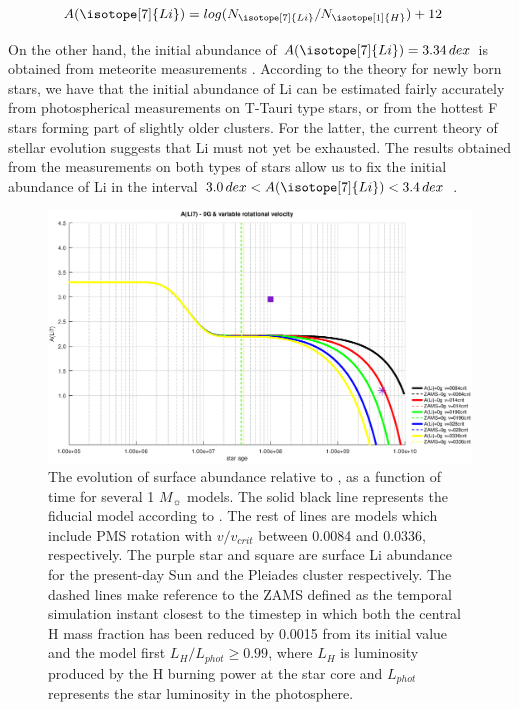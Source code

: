 \documentclass[fleqn,usenatbib]{mnras}
\begin{document}
\begin{ceqn}
\begin{align}
    A(\isotope[7]{Li}) &= log(N_{\isotope[7]{Li}} / N_{\isotope[1]{H}}) + 12
    \label{eq:A_Li}
\end{align}
\end{ceqn}

On the other hand, the initial abundance of $A(\isotope[7]{Li}) = 3.34 \, dex$ is obtained from meteorite measurements \citet{Randich2006}. According to the theory for newly born stars, we have that the initial abundance of Li can be estimated fairly accurately from photospherical measurements on T-Tauri type stars, or from the hottest F stars forming part of slightly older clusters. For the latter, the current theory of stellar evolution suggests that Li must not yet be exhausted. The results obtained from the measurements on both types of stars allow us to fix the initial abundance of Li in the interval $3.0 \, dex < A(\isotope[7]{Li}) < 3.4 \, dex$ \citet{Randich2006}.\par

\begin{figure}
	\includegraphics[width=\columnwidth]{figures/li_var_vel_0_0g.eps}
    \caption{The evolution of surface  abundance relative to , as a function of time for several 1 $M_{\sun}$ models. The solid black line represents the fiducial model according to \citet{Choi2016}. The rest of lines are models which include PMS rotation with $v/v_{crit}$ between 0.0084 and 0.0336, respectively. The purple star and square are surface Li abundance for the present-day Sun \citep{Asplund2009} and the Pleiades cluster \citep{Sestito2005} respectively. The dashed lines make reference to the ZAMS defined as the temporal simulation instant closest to the timestep in which both the central H mass fraction has been reduced by 0.0015 from its initial value and the model first $L_H/L_{phot} \geq 0.99$, where $L_{H}$ is luminosity produced by the H burning power at the star core and $L_{phot}$ represents the star luminosity in the photosphere.}
    \label{fig:li_var_vel_0g}
\end{figure}
\end{document}
